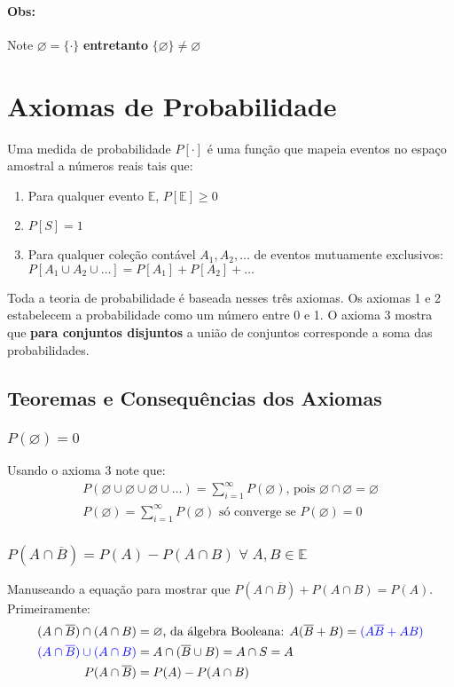 \documentclass{article}
\makeatletter
\renewcommand\bf[1]{\textbf{#1}}
\newcommand\ov[1]{\overline{#1}}
\newcommand{\vn}{\varnothing}
\def\mcolor#1#{\@mcolor{#1}}
\def\@mcolor#1#2#3{%
	\protect\leavevmode
	\begingroup
	\color#1{#2}#3%
	\endgroup
}
\makeatother
\begin{document}
\paragraph{Obs:} Note $\vn = \{\cdot\}$ \bf{entretanto} $\{\vn\} \neq \vn$

\section{Axiomas de Probabilidade}
Uma medida de probabilidade $P[\cdot]$ é uma função que mapeia eventos no espaço amostral a
números reais tais que:


\begin{enumerate}
	\setlength\itemsep{0em}
	\item Para qualquer evento $\mathbb{E}$, $P[\mathbb{E}] \geq 0$
	\item $P[S] = 1$
	\item Para qualquer coleção contável $A_1, A_2,\ldots$ de eventos mutuamente exclusivos:\\ $P[A_1
				      \cup A_2 \cup \ldots] = P[A_1] + P[A_2] + \ldots$
\end{enumerate}

Toda a teoria de probabilidade é baseada nesses três axiomas. Os axiomas 1 e 2 estabelecem a
probabilidade como um número entre 0 e 1. O axioma 3 mostra que \bf{para conjuntos disjuntos} a
união de conjuntos corresponde a soma das probabilidades.

\subsection{Teoremas e Consequências dos Axiomas}
\subsubsection{$P(\vn) = 0$}
Usando o axioma 3 note que:
\begin{align*}
	P(\vn \cup \vn \cup \vn \cup \ldots) = \sum_{i=1}^{\infty} P(\vn) \text{, pois } \vn \cap \vn = \vn \\
	P(\vn) = \sum_{i=1}^{\infty} P(\vn) \text{ só converge se } P(\vn) = 0
\end{align*}

\subsubsection{$P(A \cap \ov{B}) = P(A) - P(A \cap B) \; \forall \; A,B \in \mathbb{E}$}
Manuseando a equação para mostrar que $P(A \cap \ov{B}) + P(A \cap B)= P(A)$. Primeiramente:
\begin{align*}
	(A \cap \ov{B}) \cap (A \cap B)                & = \vn \text{, da álgebra Booleana: } A(\ov{B} + B) = \mcolor{blue}{(A\ov{B} + AB)} \\
	\mcolor{blue}{(A \cap \ov{B}) \cup (A \cap B)} & = A \cap (\ov{B} \cup B) = A \cap S = A                                            \\
	P(A \cap \ov{B})                               & = P(A) - P(A \cap B)
\end{align*}
\end{document}
